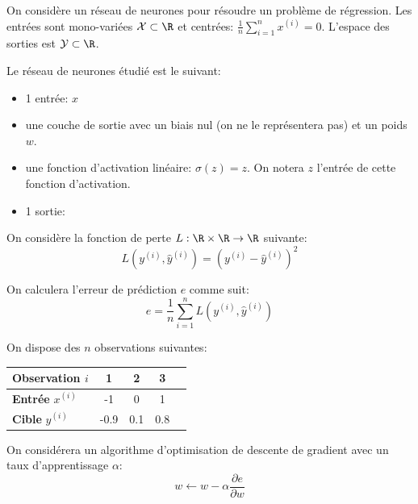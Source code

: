 \documentclass[]{../exercices}
\begin{document}
	
	
	\begin{exercice}
		On considère un réseau de neurones pour résoudre un problème de régression. Les entrées sont mono-variées $\mathcal{X} \subset \R$ et centrées: $\frac{1}{n} \sum_{i=1}^n x^{(i)} = 0$. L'espace des sorties est $\mathcal{Y} \subset \R$.
		
		Le réseau de neurones étudié est le suivant:
		\begin{itemize}
			\item 1 entrée: $x$
			\item une couche de sortie avec un biais nul (on ne le représentera pas) et un poids $w$.
			\item une fonction d'activation linéaire: $\sigma(z) = z$. On notera $z$ l'entrée de cette fonction d'activation.
			\item 1 sortie: 
		\end{itemize}
		
		On considère la fonction de perte $L: \R \times \R \to \R$ suivante:
		\begin{equation*}
			L(y^{(i)}, \hat{y}^{(i)}) = \left(y^{(i)} - \hat{y}^{(i)}\right)^2
		\end{equation*}
		
		On calculera l'erreur de prédiction $e$ comme suit:
		\begin{equation*}
			e = \frac{1}{n} \sum_{i=1}^n L(y^{(i)}, \hat{y}^{(i)})
		\end{equation*}
		
		
		On dispose des $n$ observations suivantes:
		\begin{table}[h]
			\centering
			\begin{tabular}{|l|c|c|c|c|}
				\hline
				\textbf{Observation} $i$ & 1 & 2 & 3 \\
				\hline
				\textbf{Entrée} $x^{(i)}$ & -1 & 0 & 1 \\
				\hline
				\textbf{Cible}  $y^{(i)}$ & -0.9 & 0.1 & 0.8 \\
				\hline
			\end{tabular}
		\end{table}
		
		On considérera un algorithme d'optimisation de descente de gradient avec un taux d'apprentissage $\alpha$:
		\begin{equation*}
			w \leftarrow w - \alpha \frac{\partial{e}}{\partial{w}}
		\end{equation*}
		

\end{exercice}
\end{document}
